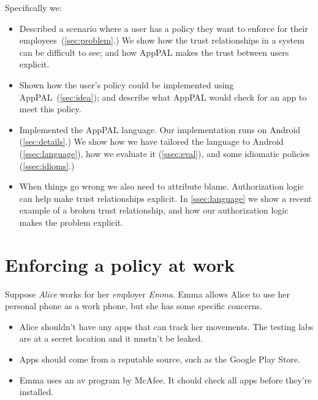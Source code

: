 \documentclass[a4paper]{scrartcl}
\begin{document}
Specifically we:
\begin{itemize}
  \item 
    Described a scenario where a user has a policy they want to enforce for their employees~(\autoref{sec:problem}.) 
    We show how the trust relationships in a system can be difficult to see;
      and how AppPAL makes the trust between users explicit.
  \item 
    Shown how the user's policy could be implemented using AppPAL~(\autoref{sec:idea}); 
      and describe what AppPAL would check for an app to meet this policy.
    
  \item Implemented the AppPAL language.  
    Our implementation runs on Android (\autoref{sec:details}.)
    We show how we have tailored the language to Android (\autoref{ssec:language}),
      how we evaluate it (\autoref{ssec:eval}),
      and some idiomatic policies (\autoref{ssec:idioms}.)

  \item When things go wrong we also need to attribute blame.
    Authorization logic can help make trust relationships explicit.
    In \autoref{ssec:language} we show a recent example of a broken trust relationship,
    and how our authorization logic makes the problem explicit.

\end{itemize}

\section{Enforcing a policy at work}
\label{sec:problem}

Suppose \emph{Alice} works for her \emph{em\/}ployer \emph{Emma}.
Emma allows Alice to use her personal phone as a work phone, but she has some specific concerns.
\begin{itemize}
  \item Alice shouldn't have any apps that can track her movements.
    The testing labs are at a secret location and it mustn't be leaked.
  \item Apps should come from a reputable source, such as the Google Play Store.
  \item Emma uses an \ac{av} program by McAfee. 
    It should check all apps before they're installed.
\end{itemize}
\end{document}

